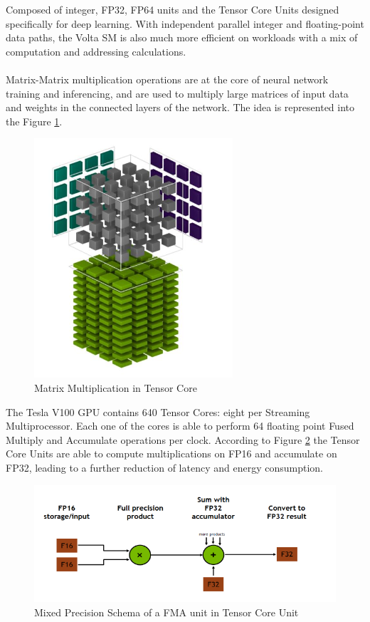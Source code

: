 Composed of integer, FP32, FP64 units and the Tensor Core Units designed specifically for deep learning. With independent parallel integer and floating-point data paths, the Volta SM is also much more efficient on workloads with a mix of computation and addressing calculations. \\\\


Matrix-Matrix multiplication operations are at the core of neural network training and inferencing, and are used to multiply large matrices of input data and weights in the connected layers of the network. The idea is represented into the Figure \ref{fig:tensorcorevolta}.


\begin{figure}[!htbp] 
\centering
\captionsetup{justification=centering}
  \includegraphics[scale=0.7]{./figure/tensor_core.PNG}
\caption{Matrix Multiplication in Tensor Core}
  \label{fig:tensorcorevolta}
\end{figure} 

The Tesla V100 GPU contains 640 Tensor Cores: eight per Streaming Multiprocessor. Each one of the cores is able to perform 64 floating point Fused Multiply and Accumulate operations per clock.
According to Figure \ref{fig:mixprec} the Tensor Core Units are able to compute multiplications on FP16 and accumulate on FP32, leading to a further reduction of latency and energy consumption.
\begin{figure}[!htbp] 
\centering
\captionsetup{justification=centering}
  \includegraphics[scale=0.8]{./figure/mix_prec.PNG}
\caption{Mixed Precision Schema of a FMA unit in Tensor Core Unit}
  \label{fig:mixprec}
\end{figure} 

